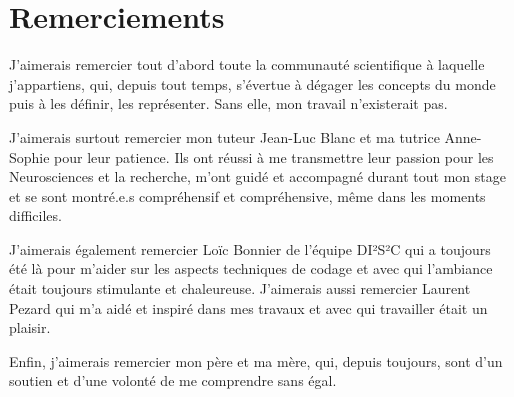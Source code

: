 \chapter*{Remerciements}

J'aimerais remercier tout d'abord toute la communauté scientifique à laquelle j'appartiens, qui, depuis tout temps, s'évertue à dégager les concepts du monde puis à les définir, les représenter. Sans elle, mon travail n'existerait pas.

J'aimerais surtout remercier mon tuteur Jean-Luc Blanc et ma tutrice Anne-Sophie pour leur patience. Ils ont réussi à me transmettre leur passion pour les Neurosciences et la recherche, m'ont guidé et accompagné durant tout mon stage et se sont montré.e.s compréhensif et compréhensive, même dans les moments difficiles. 

J'aimerais également remercier Loïc Bonnier de l'équipe DI²S²C qui a toujours été là pour m'aider sur les aspects techniques de codage et avec qui l'ambiance était toujours stimulante et chaleureuse. J'aimerais aussi remercier Laurent Pezard qui m'a aidé et inspiré dans mes travaux et avec qui travailler était un plaisir.

Enfin, j'aimerais remercier mon père et ma mère, qui, depuis toujours, sont d'un soutien et d'une volonté de me comprendre sans égal.
